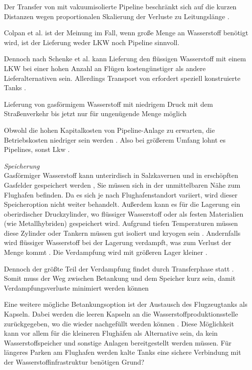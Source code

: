 Der Transfer von  mit vakuumisolierte Pipeline beschränkt sich auf die kurzen Distanzen
wegen proportionalen Skalierung der Verluste zu Leitungslänge \cite{colpan2022fuel}.

Colpan et al.\cite{colpan2022fuel} ist der Meinung im Fall, wenn große Menge an Wasserstoff benötigt wird, 
ist der Lieferung weder LKW noch Pipeline sinnvoll. 

Dennoch nach Schenke et al. \cite{schenke2024lh2} kann Lieferung den flüssigen Wasserstoff mit einem LKW bei einer hohen Anzahl an Flügen 
kostengünstiger als andere Lieferalternativen sein. Allerdings Transport von  erfordert speziell konstruierte Tanks \cite{mulder2019outlook}.

Lieferung von gasförmigem Wasserstoff mit niedrigem Druck mit dem Straßenverkehr bis jetzt nur für ungenügende Menge möglich \cite{undertaking2022strategic}

Obwohl die hohen Kapitalkosten von Pipeline-Anlage zu erwarten, die Betriebskosten niedriger sein werden \cite{mulder2019outlook}. Also bei größerem Umfang lohnt es Pipelines, sonst Lkw \cite{mulder2019outlook}.

\textit{Speicherung}\\
Gasförmiger Wasserstoff kann unterirdisch in Salzkavernen und in erschöpften Gasfelder gespeichert werden \cite{undertaking2022strategic}, 
Sie müssen sich in der unmittelbaren Nähe zum Flughafen befinden. Da es sich je nach Flughafenstandort variiert, wird dieser Speicheroption nicht weiter behandelt.
Außerdem kann es für die Lagerung ein oberirdischer Druckzylinder, wo flüssiger Wasserstoff oder als festen Materialien (wie Metallhybriden) gespeichert wird.
Aufgrund tiefen Temperaturen müssen diese Zylinder oder Tankern müssen gut isoliert und kryogen sein \cite{undertaking2022strategic}.
Andernfalls wird flüssiger Wasserstoff bei der Lagerung verdampft, was zum Verlust der Menge kommt \cite{undertaking2022strategic}. 
Die Verdampfung wird mit größeren Lager kleiner \cite{colpan2022fuel}.

Dennoch der größte Teil der Verdampfung findet durch Transferphase statt \cite{undertaking2022strategic}.
Somit muss der Weg zwischen Betankung und dem Speicher kurz sein, damit Verdampfungsverluste minimiert werden können \cite{colpan2022fuel}


Eine weitere mögliche Betankungsoption ist der Austausch des Flugzeugtanks als Kapseln. Dabei werden die leeren Kapseln an die 
Wasserstoffproduktionsstelle zurückgegeben, wo die wieder nachgefüllt werden können \cite{colpan2022fuel}. 
Diese Möglichkeit kann vor allem für die kleineren Flughäfen als Alternative sein, da kein Wasserstoffspeicher und 
sonstige Anlagen bereitgestellt werden müssen.
Für längeres Parken am Flughafen werden kalte Tanks eine sichere Verbindung mit der Wasserstoffinfrastruktur benötigen \cite{colpan2022fuel} %
Grund?


